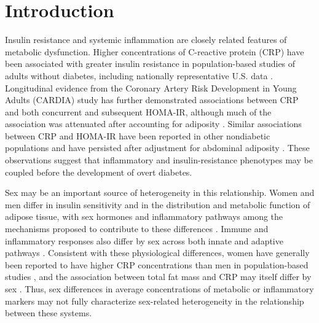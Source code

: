 \documentclass[11pt]{article}
\begin{document}

\section{Introduction}

Insulin resistance and systemic inflammation are closely related features
of metabolic dysfunction. Higher concentrations of C-reactive protein (CRP)
have been associated with greater insulin resistance in population-based
studies of adults without diabetes, including nationally representative
U.S. data \citep{Meng2007CRPInsulinResistance}. Longitudinal evidence from
the Coronary Artery Risk Development in Young Adults (CARDIA) study has
further demonstrated associations between CRP and both concurrent and
subsequent HOMA-IR, although much of the association was attenuated after
accounting for adiposity \citep{Park2009InflammationHOMA}. Similar
associations between CRP and HOMA-IR have been reported in other
nondiabetic populations and have persisted after adjustment for abdominal
adiposity \citep{Chou2010CRPInsulinResistance}. These observations suggest
that inflammatory and insulin-resistance phenotypes may be coupled before
the development of overt diabetes.

Sex may be an important source of heterogeneity in this relationship. Women
and men differ in insulin sensitivity and in the distribution and metabolic
function of adipose tissue, with sex hormones and inflammatory pathways
among the mechanisms proposed to contribute to these differences
\citep{Gado2024SexIR}. Immune and inflammatory responses also differ by sex
across both innate and adaptive pathways
\citep{KleinFlanagan2016SexImmune}. Consistent with these physiological
differences, women have generally been reported to have higher CRP
concentrations than men in population-based studies
\citep{Lakoski2006GenderCRP}, and the association between total fat mass and
CRP may itself differ by sex \citep{Khera2009SexCRPBodyFat}. Thus, sex
differences in average concentrations of metabolic or inflammatory markers
may not fully characterize sex-related heterogeneity in the relationship
between these systems.
\end{document}
